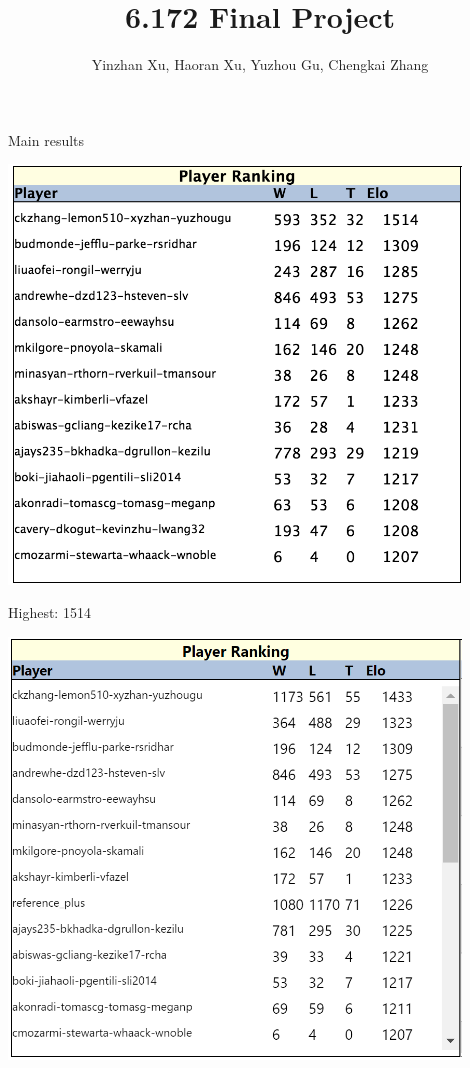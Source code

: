 \documentclass[10pt]{beamer}
\begin{document}
	\title{6.172 Final Project}
	\author{Yinzhan Xu, Haoran Xu, Yuzhou Gu, Chengkai Zhang}
	\date{}

	\begin{frame}
		\titlepage
	\end{frame}

	\begin{frame}{Main results}

        \begin{table}
        \begin{minipage}[b]{0.45\textwidth}
        \centering
        \includegraphics[width=0.9\textwidth]{scrimmage_old.png}

        Highest: 1514
        \end{minipage}
        \begin{minipage}[b]{0.45\textwidth}
        \centering
        \includegraphics[width=0.9\textwidth]{scrimmage_current.png}


\end{minipage}
\end{table}
\end{frame}
\end{document}
